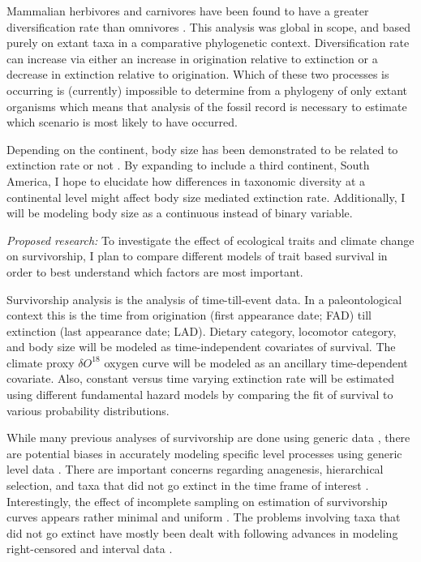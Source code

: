 \documentclass[12pt,letterpaper]{article}
\begin{document}
Mammalian herbivores and carnivores have been found to have a greater diversification rate than omnivores \citep{Price2012}. This analysis was global in scope, and based purely on extant taxa in a comparative phylogenetic context. Diversification rate can increase via either an increase in origination relative to extinction or a decrease in extinction relative to origination. Which of these two processes is occurring is (currently) impossible to determine from a phylogeny of only extant organisms \citep{Rabosky2010a} which means that analysis of the fossil record is necessary to estimate which scenario is most likely to have occurred. 

Depending on the continent, body size has been demonstrated to be related to extinction rate or not \citep{Tomiya2013,Liow2008}. By expanding to include a third continent, South America, I hope to elucidate how differences in taxonomic diversity at a continental level might affect body size mediated extinction rate. Additionally, I will be modeling body size as a continuous instead of binary variable.

\textit{Proposed research:}
To investigate the effect of ecological traits and climate change on survivorship, I plan to compare different models of trait based survival in order to best understand which factors are most important.

Survivorship analysis is the analysis of time-till-event data. In a paleontological context this is the time from origination (first appearance date; FAD) till extinction (last appearance date; LAD). Dietary category, locomotor category, and body size will be modeled as time-independent covariates of survival. The climate proxy \(\delta O^{18}\) oxygen curve \citep{Zachos2008} will be modeled as an ancillary time-dependent covariate. Also, constant versus time varying extinction rate will be estimated using different fundamental hazard models by comparing the fit of survival to various probability distributions.


While many previous analyses of survivorship are done using generic data \citep{Tomiya2013,Liow2008,Harnik2013}, there are potential biases in accurately modeling specific level processes using generic level data \citep{Raup1975,Sepkoski1975,Simpson2006,Raup1991a,VanValen1979}. There are important concerns regarding anagenesis, hierarchical selection, and taxa that did not go extinct in the time frame of interest \citep{Raup1975,VanValen1979,Simpson2006,Raup1991a}. Interestingly, the effect of incomplete sampling on estimation of survivorship curves appears rather minimal and uniform \citep{Sepkoski1975}. The problems involving taxa that did not go extinct have mostly been dealt with following advances in modeling right-censored and interval data \citep{Kleinbaum2005}.
\end{document}
